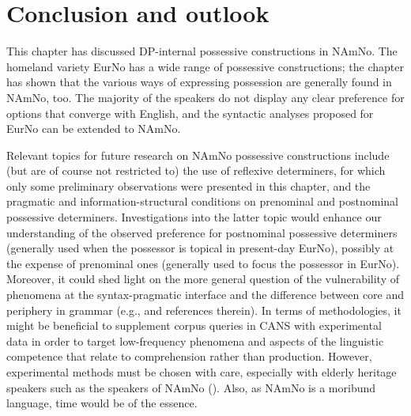 \documentclass[output=paper,colorlinks,citecolor=brown]{langscibook}
\begin{document}
\section{Conclusion and outlook}\label{sec:conclusion}
This chapter has discussed DP-internal possessive constructions in NAmNo. The homeland variety EurNo has a wide range of possessive constructions; the chapter has shown that the various ways of expressing possession are generally found in NAmNo, too. The majority of the speakers do not display any clear preference for options that converge with English, and  the syntactic analyses proposed for EurNo can be extended to NAmNo. 

Relevant topics for future research on NAmNo possessive constructions include (but are of course not restricted to) the use of reflexive determiners, for which only some preliminary observations were presented in this chapter, and the pragmatic and information-structural conditions on prenominal and postnominal possessive determiners. Investigations into the latter topic would enhance our understanding of the observed preference for postnominal possessive determiners (generally used when the possessor is topical in present-day \mbox{EurNo}), possibly at the expense of prenominal ones (generally used to focus the possessor in EurNo). Moreover, it could shed light on the more general question of the vulnerability of phenomena at the syntax-pragmatic interface and the difference between core and periphery in grammar (e.g., \citealt{sorace2011pinning, lohndaletal2019hlacquisition} and references therein). In terms of methodologies, it might be beneficial to supplement corpus queries in CANS with experimental data in order to target low-frequency phenomena and aspects of the linguistic competence that relate to comprehension rather than production. However, experimental methods must be chosen with care, especially with elderly heritage speakers such as the speakers of NAmNo (\citealt{montrul2015acquisition, polinsky2018heritage}). Also, as NAmNo is a moribund language, time would be of the essence.
\end{document}
